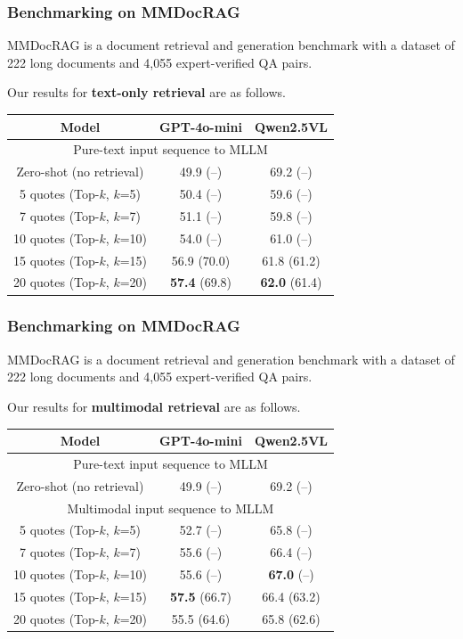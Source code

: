 \documentclass[aspectratio=1610]{beamer}
\begin{document}
    \begin{frame}
        \frametitle{Benchmarking on MMDocRAG}
        MMDocRAG is a document retrieval and generation benchmark with a dataset of 222 long documents and 4,055 expert-verified QA pairs.
        
        Our results for \textbf{text-only retrieval} are as follows.
        \begin{tabularx}{\textwidth}{@{} c | c c @{}}
            \toprule
            Model & GPT-4o-mini & Qwen2.5VL \\
            \midrule
            \endhead
            \multicolumn{3}{c}{Pure-text input sequence to MLLM} \\
            \midrule
            Zero-shot (no retrieval) & 49.9 (--) & 69.2 (--) \\
            \midrule
            5 quotes (Top-$k$, $k$=5) & 50.4 (--) & 59.6 (--) \\
            7 quotes (Top-$k$, $k$=7) & 51.1 (--) & 59.8 (--) \\
            10 quotes (Top-$k$, $k$=10) & 54.0 (--) & 61.0 (--) \\
            15 quotes (Top-$k$, $k$=15) & 56.9 (70.0) & 61.8 (61.2) \\
            20 quotes (Top-$k$, $k$=20) & \textbf{57.4} (69.8) & \textbf{62.0} (61.4) \\
            \bottomrule
        \end{tabularx}
    \end{frame}

    \begin{frame}
        \frametitle{Benchmarking on MMDocRAG}
        MMDocRAG is a document retrieval and generation benchmark with a dataset of 222 long documents and 4,055 expert-verified QA pairs.
        
        Our results for \textbf{multimodal retrieval} are as follows.
        \begin{tabularx}{\textwidth}{@{} c | c c @{}}
            \toprule
            Model & GPT-4o-mini & Qwen2.5VL \\
            \midrule
            \endhead
            \multicolumn{3}{c}{Pure-text input sequence to MLLM} \\
            \midrule
            Zero-shot (no retrieval) & 49.9 (--) & 69.2 (--) \\
            \midrule
            \multicolumn{3}{c}{Multimodal input sequence to MLLM} \\
            \midrule
            5 quotes (Top-$k$, $k$=5) & 52.7 (--) & 65.8 (--) \\
            7 quotes (Top-$k$, $k$=7) & 55.6 (--) & 66.4 (--) \\
            10 quotes (Top-$k$, $k$=10) & 55.6 (--) & \textbf{67.0} (--) \\
            15 quotes (Top-$k$, $k$=15) & \textbf{57.5} (66.7) & 66.4 (63.2) \\
            20 quotes (Top-$k$, $k$=20) & 55.5 (64.6) & 65.8 (62.6) \\
            \bottomrule
        \end{tabularx}
    \end{frame}
\end{document}
